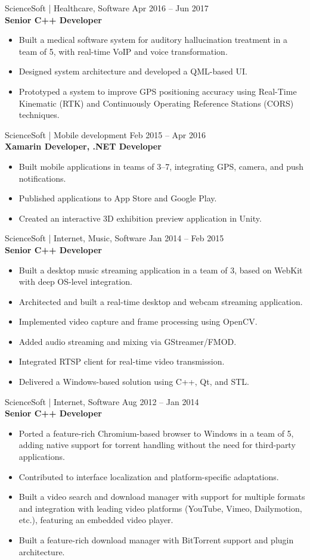 \documentclass[10pt, a4paper]{article}
\newcommand{\roleentry}[3]{%
    \vspace{8pt}%
    {\normalsize #1 \hfill {\small\color{graytext}#3}}\\[1pt]%
    {\textbf{#2}}%
    \vspace{1pt}%
}
\begin{document}
\roleentry{ScienceSoft | Healthcare, Software}{Senior C++ Developer}{Apr 2016 -- Jun 2017}
\begin{itemize}
    \item Built a medical software system for auditory hallucination treatment in a team of 5, with real-time VoIP and voice transformation.
    \item Designed system architecture and developed a QML-based UI.
    \item Prototyped a system to improve GPS positioning accuracy using Real-Time Kinematic (RTK) and Continuously Operating Reference Stations (CORS) techniques.
\end{itemize}

\roleentry{ScienceSoft | Mobile development}{Xamarin Developer, .NET Developer}{Feb 2015 -- Apr 2016}
\begin{itemize}
    \item Built mobile applications in teams of 3–7, integrating GPS, camera, and push notifications.
    \item Published applications to App Store and Google Play.
    \item Created an interactive 3D exhibition preview application in Unity.
\end{itemize}

\roleentry{ScienceSoft | Internet, Music, Software}{Senior C++ Developer}{Jan 2014 -- Feb 2015}
\begin{itemize}
    \item Built a desktop music streaming application in a team of 3, based on WebKit with deep OS-level integration.
    \item Architected and built a real-time desktop and webcam streaming application.
    \item Implemented video capture and frame processing using OpenCV.
    \item Added audio streaming and mixing via GStreamer/FMOD.
    \item Integrated RTSP client for real-time video transmission.
    \item Delivered a Windows-based solution using C++, Qt, and STL.
\end{itemize}

\roleentry{ScienceSoft | Internet, Software}{Senior C++ Developer}{Aug 2012 -- Jan 2014}
\begin{itemize}
    \item Ported a feature-rich Chromium-based browser to Windows in a team of 5, adding native support for torrent handling without the need for third-party applications.
    \item Contributed to interface localization and platform-specific adaptations.
    \item Built a video search and download manager with support for multiple formats and integration with leading video platforms (YouTube, Vimeo, Dailymotion, etc.), featuring an embedded video player.
    \item Built a feature-rich download manager with BitTorrent support and plugin architecture.
\end{itemize}
\end{document}
